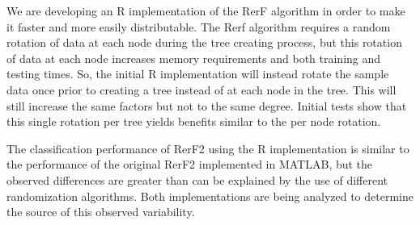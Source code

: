 \documentclass[simplex.tex]{subfiles}
\begin{document}
We are developing an R implementation of the RerF algorithm in order to make it
faster and more easily distributable.  The Rerf algorithm requires a random
rotation of data at each node during the tree creating process, but this
rotation of data at each node increases memory requirements and both training
and testing times.  So, the initial R implementation will instead rotate the
sample data once prior to creating a tree instead of at each node in the tree.
This will still increase the same factors but not to the same degree.  Initial
tests show that this single rotation per tree yields benefits similar to the
per node rotation.

The classification performance of RerF2 using the R implementation is similar
to the performance of the original RerF2 implemented in MATLAB, but the
observed differences are greater than can be explained by the use of different
randomization algorithms.  Both implementations are being analyzed to determine
the source of this observed variability.

\end{document}
